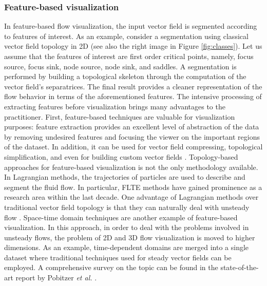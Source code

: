 \subsubsection{Feature-based visualization} 
%
In feature-based flow visualization, the input vector field is segmented according to features of interest. 
%
As an example, consider a segmentation using classical vector field topology in 2D \cite{Helman:1989:RDV:72885.72887} (see also the right image in Figure \ref{fig:classes}). 
%
Let us assume that the features of interest are first order critical points, namely, focus source, focus sink, node source, node sink, and saddles. 
%
A segmentation is performed by building a topological skeleton through the computation of the vector field's separatrices.
%
The final result provides a cleaner representation of the flow behavior in terms of the aforementioned features.
%
The intensive processing of extracting features before visualization brings many advantages to the practitioner.
%
First, feature-based techniques are valuable for visualization purposes: 
%
feature extraction provides an excellent level of abstraction of the data by removing undesired features and focusing the viewer on the important regions of the dataset.
%
In addition, it can be used for vector field compressing, topological simplification, and even for building custom vector fields \cite{theisel2008}. 
%
Topology-based approaches for feature-based visualization is not the only methodology available.
%
In Lagrangian methods, the trajectories of particles are used to describe and segment the fluid flow.
%
In particular, FLTE \cite{Haller:2001:DMS:370169.370176} methods have gained prominence as a research area within the last decade.
%
One advantage of Lagrangian methods over traditional vector field topology is that they can naturally deal with unsteady flow \cite{CGF:CGF1901}. 
%
Space-time domain techniques are another example of feature-based visualization.
%
In this approach, in order to deal with the problems involved in unsteady flows, the problem of 2D and 3D flow visualization is moved to higher dimensions.
%
As an example, time-dependent domains are merged into a single dataset where traditional techniques used for steady vector fields can be employed.
%
A comprehensive survey on the topic can be found in the state-of-the-art report by Pobitzer \emph{et al.} \cite{CGF:CGF1901}.


